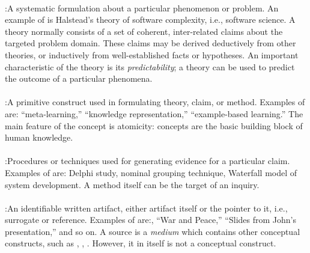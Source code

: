 \paragraph{}

\noindent{}:\hspace{.2in}A systematic formulation about a
particular phenomenon or problem. An example of  is
Halstead's theory of software complexity, i.e., software science. A theory
normally consists of a set of coherent, inter-related claims about the
targeted problem domain. These claims may be derived deductively from other
theories, or inductively from well-established facts or hypotheses. An
important characteristic of the theory is its {\it predictability\/}; a
theory can be used to predict the outcome of a particular phenomena.

\paragraph{}

\noindent{}:\hspace{.2in}A primitive construct used in
formulating theory, claim, or method. Examples of 
are: ``meta-learning,'' ``knowledge representation,'' ``example-based
learning.'' The main feature of the concept is atomicity: concepts are the
basic building block of human knowledge.

\paragraph{}

\noindent{}:\hspace{.2in}Procedures or techniques used for
generating evidence for a particular claim. Examples of  are: Delphi study, nominal grouping technique, Waterfall model
of system development. A method itself can be the target of an inquiry.

\paragraph{}

\noindent{}:\hspace{.2in}An identifiable written artifact,
either artifact itself or the pointer to it, i.e., surrogate or reference.
Examples of  are:, ``War and Peace,'' ``Slides from
John's presentation,'' and so on.  A source is a {\it medium\/} which
contains other conceptual constructs, such as ,
, . However,  it in itself is not a conceptual construct.

